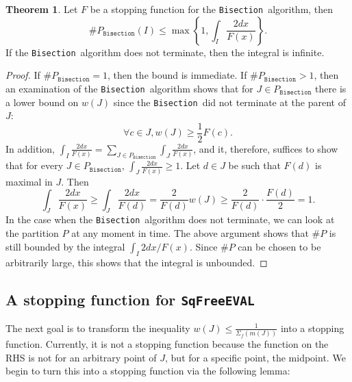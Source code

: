 \documentclass{amsart}
\theoremstyle{definition}
\newtheorem{theorem}{Theorem}[section]
\newcommand{\EVAL}{\texttt{SqFreeEVAL}}
\newcommand{\GEN}{\texttt{Bisection}}
\begin{document}
\begin{theorem}\cite[Theorem 3.5]{Burr-Krahmer-Yap:integral:09}\label{thm:integral}
Let $F$ be a stopping function for the \GEN\ algorithm, then
$$\#P_{\GEN}(I) \leq\max\left\{1,\int_I\frac{2dx}{F(x)}\right\}.$$
If the \GEN\ algorithm does not terminate, then the integral is infinite.
\begin{proof}
If $\#P_{\GEN}=1$, then the bound is immediate.  If $\#P_{\GEN}>1$, then an examination of the \GEN\ algorithm shows that for $J\in P_{\GEN}$ there is a lower bound on $w(J)$ since the \GEN\ did not terminate at the parent of $J$:
$$\forall c\in J, w(J)\geq\frac{1}{2} F(c).$$
In addition, $\int_I{\frac{2dx}{F(x)}}=\sum_{J\in P_{\GEN}}\int_J{\frac{2dx}{F(x)}}$, and it, therefore, suffices to show that for every $J\in P_{\GEN}$, $\int_J{\frac{2dx}{F(x)}}\ge1$.  Let $d\in J$ be such that $F(d)$ is maximal in $J$.  Then
\begin{equation*}
\int_J{\frac{2dx}{F(x)}}\ge\int_J{\frac{2dx}{F(d)}}=\frac{2}{F(d)}w(J)\ge\frac{2}{F(d)}\cdot\frac{F(d)}{2}=1.
\end{equation*}
In the case when the \GEN\ algorithm does not terminate, we can look at the partition $P$ at any moment in time.  The above argument shows that $\#P$ is still bounded by the integral $\int_I 2dx/F(x)$.  Since $\#P$ can be chosen to be arbitrarily large, this shows that the integral is unbounded.
\end{proof}
\end{theorem}

\subsection{A stopping function for \EVAL}\label{sec:stopeval}
The next goal is to transform the inequality $w(J)\leq\frac{1}{\Sigma_f(m(J))}$ into a stopping function.  Currently, it is not a stopping function because the function on the RHS is not for an arbitrary point of $J$, but for a specific point, the midpoint.  We begin to turn this into a stopping function via the following lemma:
\end{document}
